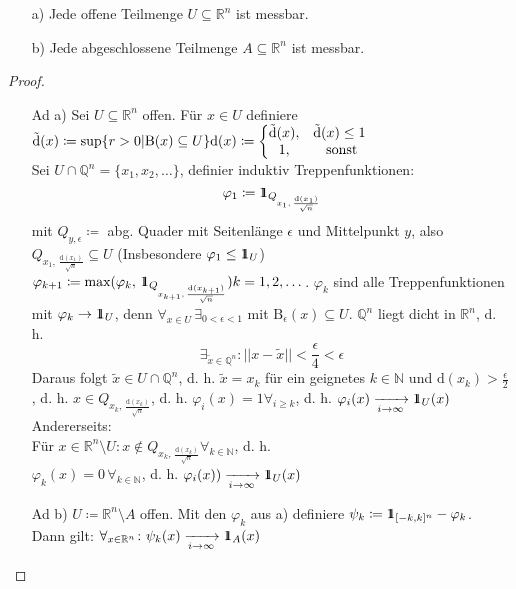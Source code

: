 \begin{lemma}\label{Lem:Messbar}
    \begin{itemize}
        \item[a)] Jede offene Teilmenge $U\subseteq\mathbb{R}^n$ ist messbar.
        \item[b)] Jede abgeschlossene Teilmenge $A\subseteq\mathbb{R}^n$ ist messbar. 
    \end{itemize}
\end{lemma}
\begin{proof}
    \begin{itemize}
        \item[Ad a)] Sei $U\subseteq\mathbb{R}^n$ offen. Für $x\in U$ definiere $\tilde{\text{d}}(x) \coloneqq \text{sup}\{r>0|\text{B}(x)\subseteq U\}\\
        \text{d}(x) \coloneqq \left\{\begin{matrix}
            \tilde{\text{d}}(x), & \tilde{\text{d}}(x)\leq 1\\
            1, & \text{ sonst}
        \end{matrix}\right.$\\
        Sei $U \cap \mathbb{Q}^n =\{x_1,x_2,\dots\}$, definier induktiv Treppenfunktionen: \begin{equation*}
            \varphi_1\coloneqq \id_{Q_{x_1, \,\frac{\text{d}(x_1)}{\sqrt{n}}}}
        \end{equation*} mit $Q_{y,\epsilon}\coloneqq$ abg. Quader mit Seitenlänge $\epsilon$ und Mittelpunkt $y$, also $Q_{x_1, \,\frac{\text{d}(x_1)}{\sqrt{n}}} \subseteq U$ (Insbesondere $\varphi_1 \leq \id_U$)\\
        $\varphi_{k+1}\coloneqq\text{max}(\varphi_k,\, \id_{Q_{x_{k+1}, \,\frac{\text{d}(x_{k+1})}{\sqrt{n}}}}) k=1,2,\dots$. $\varphi_k$ sind alle Treppenfunktionen mit $\varphi_k \to \id_U$, denn $\forall_{x\in U} \,\exists_{0<\epsilon<1}$ mit $\text{B}_{\epsilon} (x) \subseteq U$. $\mathbb{Q}^n$ liegt dicht in $\mathbb{R}^n$, d. h. \[\exists_{\tilde{x}\in\mathbb{Q}^n}\colon ||x-\tilde{x}|| < \frac{\epsilon}{4}<\epsilon\]
        Daraus folgt $\tilde{x}\in U\cap\mathbb{Q}^n$, d. h. $\tilde{x}=x_k$ für ein geignetes $k\in\mathbb{N}$ und $\text{d}(x_k) > \frac{\epsilon}{2}$, d. h. $x\in Q_{x_k, \, \frac{\text{d}(x_k)}{\sqrt{n}}}$, d. h. $\varphi_i(x)= 1 \forall_{i \geq k}$, d. h. $\varphi_i(x)\xrightarrow[i\to\infty]{}\id_U(x)$\\
        Andererseits:\\
        Für $x\in\mathbb{R}^n\setminus U \colon x\notin Q_{x_k, \, \frac{\text{d}(x_k)}{\sqrt{n}}} \forall_{k\in\mathbb{N}}$, d. h.\\ $\varphi_k(x) = 0 \, \forall_{k\in\mathbb{N}}$, d. h. $\varphi_i(x))\xrightarrow[i\to\infty]{}\id_U(x)$
        \item[Ad b)] $U \coloneqq \mathbb{R}^n \setminus A$ offen. Mit den $\varphi_k$ aus a) definiere $\psi_k \coloneqq \id_{[-k,k]^n}-\varphi_k$.\\
        Dann gilt: $\forall_{x\in\mathbb{R}^n}\colon \psi_k (x) \xrightarrow[i\to\infty]{}\id_A(x)$
    \end{itemize}
\end{proof}

